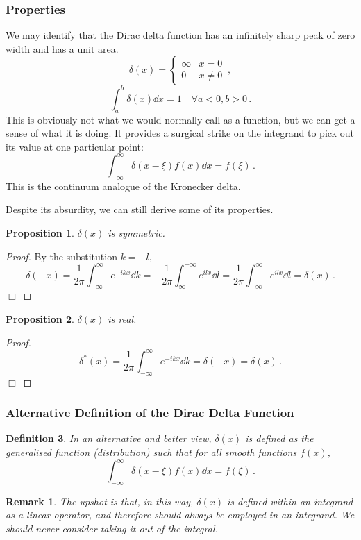 \documentclass{article}
\theoremstyle{plain}\theoremheaderfont{\normalfont\itshape}\theorembodyfont{\rmfamily}\theoremseparator{.}\newtheorem*{rem}{Remark}\newtheorem*{ex}{Example}\newtheorem*{proof}{Proof}\newtheorem*{altp}{Alternative proof}
\theoremstyle{plain}\theoremheaderfont{\normalfont\bfseries}\theorembodyfont{\rmfamily}\theoremseparator{.}\newtheorem{thm}{Theorem}[section]\newtheorem{lem}[thm]{Lemma}\newtheorem{prop}[thm]{Proposition}\newtheorem*{cor}{Corollary}\newtheorem{defn}[thm]{Definition}\newtheorem{clm}[thm]{Claim}\newtheorem{clminproof}{Claim}
\theoremstyle{break}\theoremheaderfont{\normalfont\itshape}\theorembodyfont{\rmfamily}\theoremseparator{.\medskip}\newtheorem*{proofskip}{Proof}\newtheorem*{exs}{Examples}\newtheorem*{rems}{Remarks}
\theoremstyle{break}\theoremheaderfont{\normalfont\bfseries}\theorembodyfont{\rmfamily}\theoremseparator{.\medskip}\newtheorem{lemskip}[thm]{Lemma}\newtheorem{defnskip}[thm]{Definition}\newtheorem{propskip}[thm]{Proposition}\newtheorem{thmskip}[thm]{Theorem}
\numberwithin{equation}{section}
\newcommand{\qed}{\hfill\ensuremath{\Box}}
\begin{document}
	\subsubsection{Properties}
	We may identify that the Dirac delta function has an infinitely sharp peak of zero width and has a unit area.
	\[\delta(x)=\begin{cases}
		\infty & x=0\\
		0 & x\ne 0
	\end{cases}\,,\]
	\[\int_{a}^{b}\delta(x)\dd{x}=1 \quad \forall a<0, b>0\,.\]
	This is obviously not what we would normally call as a function, but we can get a sense of what it is doing. It provides a surgical strike on the integrand to pick out its value at one particular point:
	\[\int_{-\infty}^{\infty}\delta(x-\xi)f(x)\dd{x}=f(\xi)\,.\]
	This is the continuum analogue of the Kronecker delta.
	
	Despite its absurdity, we can still derive some of its properties.
	\begin{prop}
		\(\delta(x)\) is symmetric.
	\end{prop}
	\begin{proof}
		By the substitution \(k=-l\),
		\[\delta(-x)=\frac{1}{2\pi}\int_{-\infty}^{\infty}e^{-ikx}\dd{k}=-\frac{1}{2\pi}\int_{\infty}^{-\infty}e^{ilx}\dd{l}=\frac{1}{2\pi}\int_{-\infty}^{\infty}e^{ilx}\dd{l}=\delta(x)\,.\]\qed
	\end{proof}
	\begin{prop}
		\(\delta(x)\) is real.
	\end{prop}
	\begin{proof}
		\[\delta^*(x)=\frac{1}{2\pi}\int_{-\infty}^{\infty}e^{-ikx}\dd{k}=\delta(-x)=\delta(x)\,.\]\qed
	\end{proof}
	\subsubsection{Alternative Definition of the Dirac Delta Function}
	\begin{defn}
		In an alternative and better view, \(\delta(x)\) is defined as the generalised function (distribution) such that for all smooth functions \(f(x)\),
		\[\int_{-\infty}^{\infty}\delta(x-\xi)f(x)\dd{x}=f(\xi)\,.\]
	\end{defn}
	\begin{rem}
		The upshot is that, in this way, \(\delta(x)\) is defined within an integrand as a linear operator, and therefore should always be employed in an integrand. We should never consider taking it out of the integral.
	\end{rem}
\end{document}
